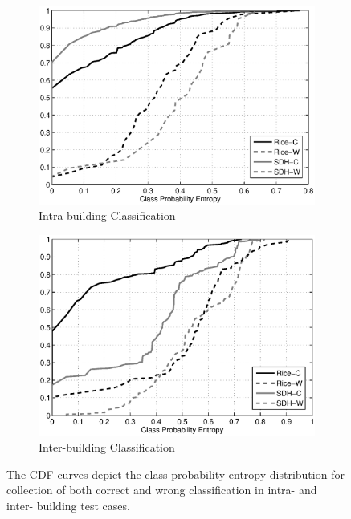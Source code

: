 \begin{figure}[ht!]
\centering
	\begin{subfigure}{0.48\textwidth}
                \centering
		\includegraphics[width=\textwidth]{./fig/cdf_intra.eps}
                \caption{Intra-building Classification}
                \label{fig:cdf_intra}
	\end{subfigure}
	\begin{subfigure}{0.48\textwidth}
                \centering
		\includegraphics[width=\textwidth]{./fig/cdf_inter.eps}
                \caption{Inter-building Classification}
                \label{fig:cdf_inter}
	\end{subfigure}
\caption{The CDF curves depict the class probability entropy distribution for collection of both correct and wrong classification in intra- and inter- building test cases.}
\label{fig:cdf}
\end{figure}

